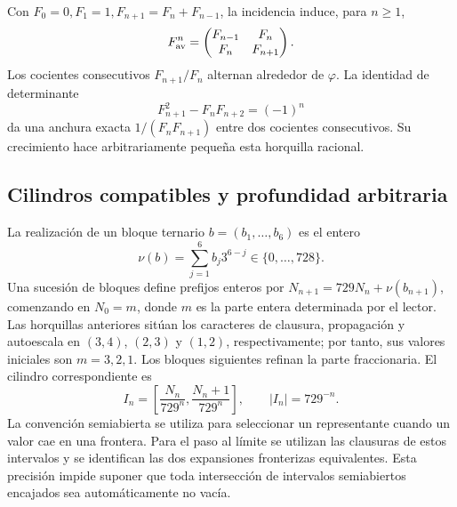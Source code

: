 Con \(F_0=0,F_1=1,F_{n+1}=F_n+F_{n-1}\), la incidencia induce, para \(n\geq1\),
\[
 F_{\rm av}^n=\begin{pmatrix}F_{n-1}&F_n\\F_n&F_{n+1}\end{pmatrix}.
\]
Los cocientes consecutivos \(F_{n+1}/F_n\) alternan alrededor de \(\varphi\). La identidad de determinante
\[
 F_{n+1}^2-F_nF_{n+2}=(-1)^n
\]
da una anchura exacta \(1/(F_nF_{n+1})\) entre dos cocientes consecutivos. Su crecimiento hace arbitrariamente pequeña esta horquilla racional.

\subsection{Cilindros compatibles y profundidad arbitraria}

La realización de un bloque ternario \(b=(b_1,\ldots,b_6)\) es el entero
\[
 \nu(b)=\sum_{j=1}^6b_j3^{6-j}\in\{0,\ldots,728\}.
\]
Una sucesión de bloques define prefijos enteros por \(N_{n+1}=729N_n+\nu(b_{n+1})\), comenzando en \(N_0=m\), donde \(m\) es la parte entera determinada por el lector. Las horquillas anteriores sitúan los caracteres de clausura, propagación y autoescala en \((3,4)\), \((2,3)\) y \((1,2)\), respectivamente; por tanto, sus valores iniciales son \(m=3,2,1\). Los bloques siguientes refinan la parte fraccionaria. El cilindro correspondiente es
\begin{equation}
 I_n=\left[\frac{N_n}{729^n},\frac{N_n+1}{729^n}\right],
 \qquad |I_n|=729^{-n}.
 \label{eq:cilindro}
\end{equation}
La convención semiabierta se utiliza para seleccionar un representante cuando un valor cae en una frontera. Para el paso al límite se utilizan las clausuras de estos intervalos y se identifican las dos expansiones fronterizas equivalentes. Esta precisión impide suponer que toda intersección de intervalos semiabiertos encajados sea automáticamente no vacía.

